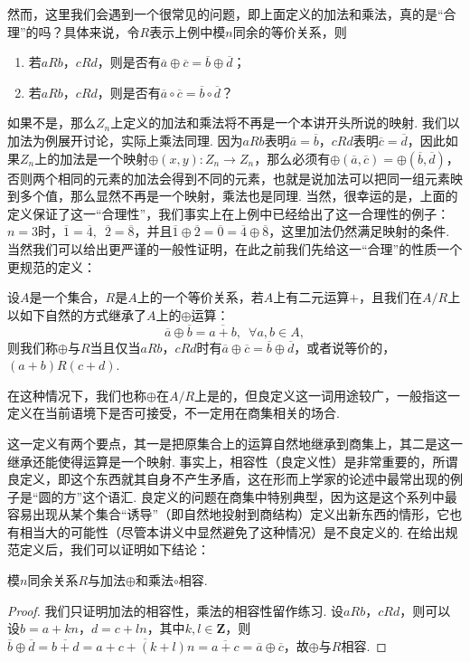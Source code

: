 然而，这里我们会遇到一个很常见的问题，即上面定义的加法和乘法，真的是``合理''的吗？具体来说，令$R$表示上例中模$n$同余的等价关系，则
\begin{enumerate}
    \item 若$aRb$，$cRd$，则是否有$\overline{a}\oplus\overline{c}=\overline{b}\oplus\overline{d}$；
    \item 若$aRb$，$cRd$，则是否有$\overline{a}\circ\overline{c}=\overline{b}\circ\overline{d}$？
\end{enumerate}
如果不是，那么$Z_n$上定义的加法和乘法将不再是一个本讲开头所说的映射. 我们以加法为例展开讨论，实际上乘法同理. 因为$aRb$表明$\overline{a}=\overline{b}$，$cRd$表明$\overline{c}=\overline{d}$，因此如果$Z_n$上的加法是一个映射$\oplus(x,y):Z_n\to Z_n$，那么必须有$\oplus(\overline{a},\overline{c})=\oplus(\overline{b},\overline{d})$，否则两个相同的元素的加法会得到不同的元素，也就是说加法可以把同一组元素映到多个值，那么显然不再是一个映射，乘法也是同理. 当然，很幸运的是，上面的定义保证了这一``合理性''，我们事实上在上例中已经给出了这一合理性的例子：$n=3$时，$\overline{1}=\overline{4},\enspace\overline{2}=\overline{8}$，并且$\overline{1}\oplus\overline{2}=\overline{0}=\overline{4}\oplus\overline{8}$，这里加法仍然满足映射的条件. 当然我们可以给出更严谨的一般性证明，在此之前我们先给这一``合理''的性质一个更规范的定义：
\begin{definition}{}{}
    设$A$是一个集合，$R$是$A$上的一个等价关系，若$A$上有二元运算$+$，且我们在$A/R$上以如下自然的方式继承了$A$上的$\oplus$运算：
    \[\overline{a}\oplus\overline{b}=\overline{a+b},\enspace\forall a,b\in A,\]
    则我们称$\oplus$与$R$当且仅当$aRb$，$cRd$时有$\overline{a}\oplus\overline{c}=\overline{b}\oplus\overline{d}$，或者说等价的，$(a+b)R(c+d)$.
\end{definition}

在这种情况下，我们也称$\oplus$在$A/R$上是的，但良定义这一词用途较广，一般指这一定义在当前语境下是否可接受，不一定用在商集相关的场合.

这一定义有两个要点，其一是把原集合上的运算自然地继承到商集上，其二是这一继承还能使得运算是一个映射. 事实上，相容性（良定义性）是非常重要的，所谓良定义，即这个东西就其自身不产生矛盾，这在形而上学家的论述中最常出现的例子是``圆的方''这个语汇. 良定义的问题在商集中特别典型，因为这是这个系列中最容易出现从某个集合``诱导''（即自然地投射到商结构）定义出新东西的情形，它也有相当大的可能性（尽管本讲义中显然避免了这种情况）是不良定义的. 在给出规范定义后，我们可以证明如下结论：

\begin{theorem}{}{}
    模$n$同余关系$R$与加法$\oplus$和乘法$\circ$相容.
\end{theorem}
\begin{proof}
    我们只证明加法的相容性，乘法的相容性留作练习. 设$aRb$，$cRd$，则可以设$b=a+kn$，$d=c+ln$，其中$k,l\in\mathbf{Z}$，则$\overline{b}\oplus\overline{d}=\overline{b+d}=\overline{a+c+(k+l)n}=\overline{a+c}=\overline{a}\oplus\overline{c}$，故$\oplus$与$R$相容.
\end{proof}

